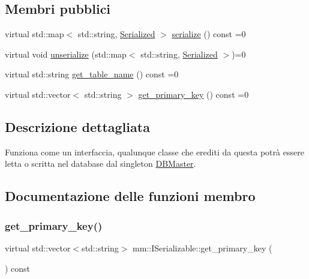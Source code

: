 \subsection*{Membri pubblici}
\begin{DoxyCompactItemize}
\item 
virtual std\+::map$<$ std\+::string, \mbox{\hyperlink{structmm_1_1_serialized}{Serialized}} $>$ \mbox{\hyperlink{classmm_1_1_i_serializable_a20a59e2324c8dbf6fefe4d11ae89d0fb}{serialize}} () const =0
\item 
virtual void \mbox{\hyperlink{classmm_1_1_i_serializable_a8e5329b3b23cd0dff0ea8f5f63bab996}{unserialize}} (std\+::map$<$ std\+::string, \mbox{\hyperlink{structmm_1_1_serialized}{Serialized}} $>$)=0
\item 
virtual std\+::string \mbox{\hyperlink{classmm_1_1_i_serializable_a9717e6da47fcbac3ffa2e68152464e0a}{get\+\_\+table\+\_\+name}} () const =0
\item 
virtual std\+::vector$<$ std\+::string $>$ \mbox{\hyperlink{classmm_1_1_i_serializable_a69c0c514e11e386b6cb1fbd03f14da17}{get\+\_\+primary\+\_\+key}} () const =0
\end{DoxyCompactItemize}


\subsection{Descrizione dettagliata}
Funziona come un interfaccia, qualunque classe che erediti da questa potrà essere letta o scritta nel database dal singleton \mbox{\hyperlink{classmm_1_1_d_b_master}{D\+B\+Master}}. 

\subsection{Documentazione delle funzioni membro}
\mbox{\label{classmm_1_1_i_serializable_a69c0c514e11e386b6cb1fbd03f14da17}} 
\subsubsection{\texorpdfstring{get\+\_\+primary\+\_\+key()}{get\_primary\_key()}}
{\footnotesize\ttfamily virtual std\+::vector$<$std\+::string$>$ mm\+::\+I\+Serializable\+::get\+\_\+primary\+\_\+key (\begin{DoxyParamCaption}{ }\end{DoxyParamCaption}) const\hspace{0.3cm}{\ttfamily [pure virtual]}}



